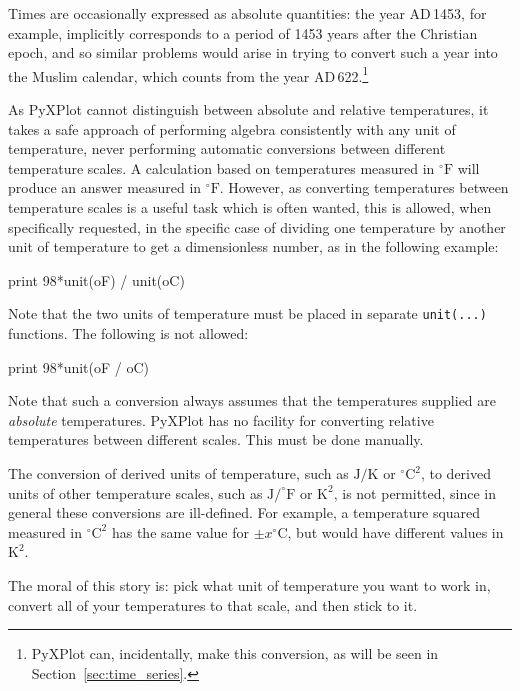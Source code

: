 Times are occasionally expressed as absolute quantities: the year
{\footnotesize AD}\,1453, for example, implicitly corresponds to a period of
1453 years after the Christian epoch, and so similar problems would arise in
trying to convert such a year into the Muslim calendar, which counts from the
year {\footnotesize AD}\,622.\footnote{PyXPlot can, incidentally, make this
conversion, as will be seen in Section~\ref{sec:time_series}.}

As PyXPlot cannot distinguish between absolute and relative temperatures, it
takes a safe approach of performing algebra consistently with any unit of
temperature, never performing automatic conversions between different
temperature scales. A calculation based on temperatures measured in
$^\circ\mathrm{F}$ will produce an answer measured in $^\circ\mathrm{F}$.
However, as converting temperatures between temperature scales is a useful task
which is often wanted, this is allowed, when specifically requested, in the
specific case of dividing one temperature by another unit of temperature to get
a dimensionless number, as in the following example:

\begin{dodo}
print 98*unit(oF) / unit(oC)
\end{dodo}

\noindent Note that the two units of temperature must be placed in separate
{\tt unit(...)} functions. The following is not allowed:

\begin{dontdo}
print 98*unit(oF / oC)
\end{dontdo}

Note that such a conversion always assumes that the temperatures supplied are
{\it absolute} temperatures. PyXPlot has no facility for converting relative
temperatures between different scales. This must be done manually.

The conversion of derived units of temperature, such as $\mathrm{J}/\mathrm{K}$ or
$^\circ\mathrm{C}^2$, to derived units of other temperature scales, such as
$\mathrm{J}/^\circ\mathrm{F}$ or $\mathrm{K}^2$, is not permitted, since in
general these conversions are ill-defined. For example, a temperature squared
measured in $^\circ\mathrm{C}^2$ has the same value for $\pm
x^\circ\mathrm{C}$, but would have different values in $\mathrm{K}^2$.

The moral of this story is: pick what unit of temperature you want to work in,
convert all of your temperatures to that scale, and then stick to it.

